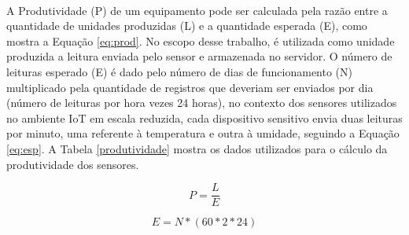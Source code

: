 \\\null \quad A Produtividade (P) de um equipamento pode ser calculada pela razão entre a quantidade de unidades produzidas (L) e a quantidade esperada (E), como mostra a Equação \ref{eq:prod}. No escopo desse trabalho, é utilizada como unidade produzida a leitura enviada pelo sensor e armazenada no servidor. O número de leituras esperado (E) é dado pelo número de dias de funcionamento (N) multiplicado pela quantidade de registros que deveriam ser enviados por dia (número de leituras por hora vezes 24 horas), no contexto dos sensores utilizados no ambiente \acrshort{IoT} em escala reduzida, cada dispositivo sensitivo envia duas leituras por minuto, uma referente à temperatura e outra à umidade,  seguindo a Equação \ref{eq:esp}. A Tabela \ref{produtividade} mostra os dados utilizados para o cálculo da produtividade dos sensores.

\begin{equation}
  P = \frac{L}{E}
  \label{eq:prod}
\end{equation}

\begin{equation}
  E = N * (60 * 2 * 24)
  \label{eq:esp}
\end{equation}

